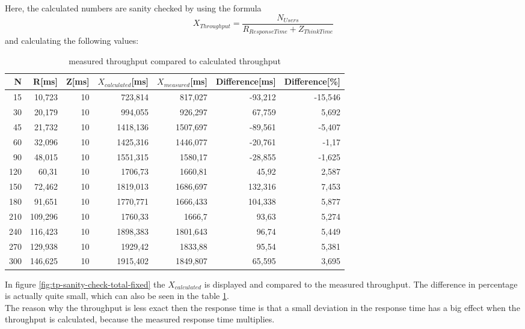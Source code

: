 \documentclass[a4paper]{article}
\begin{document}
{Here, the calculated numbers are sanity checked by using the formula $$X_{Throughput}=\frac{N_{Users}}{R_{ResponseTime} + Z_{ThinkTime}}$$ and calculating the following values:

\begin{table}[h!]
\begin{center}
\begin{tabular}{|r|r|r|r|r|r|r|}
\hline
\textbf{N} & \textbf{R[ms]} & \textbf{Z[ms]} & \textbf{$X_{calculated}$[ms]} & \textbf{$X_{measured}$[ms]} & \textbf{Difference[ms]} & \textbf{Difference[\%]} \\ \hline
15  & 10,723 & 10 & 723,814  & 817,027 & -93,212 & -15,546 \\ \hline
30  & 20,179 & 10 & 994,055  & 926,297 & 67,759  & 5,692   \\ \hline
45  & 21,732 & 10 & 1418,136  & 1507,697 & -89,561 & -5,407 \\ \hline
60  & 32,096 & 10 & 1425,316  & 1446,077 & -20,761 & -1,17 \\ \hline
90  & 48,015 & 10 & 1551,315  & 1580,17     & -28,855 & -1,625 \\ \hline
120 & 60,31 & 10 & 1706,73  & 1660,81     & 45,92  & 2,587  \\ \hline
150 & 72,462 & 10 & 1819,013  & 1686,697 & 132,316  & 7,453  \\ \hline
180 & 91,651 & 10 & 1770,771  & 1666,433 & 104,338  & 5,877   \\ \hline
210 & 109,296 & 10 & 1760,33   & 1666,7      & 93,63  & 5,274  \\ \hline
240 & 116,423 & 10 & 1898,383  & 1801,643 & 96,74  & 5,449  \\ \hline
270 & 129,938  & 10 & 1929,42   & 1833,88     & 95,54  & 5,381  \\ \hline
300 & 146,625 & 10 & 1915,402  & 1849,807 & 65,595  & 3,695  \\ \hline
\end{tabular}
\caption{measured throughput compared to calculated throughput}
\label{tab:sanity-check}
\end{center}
\end{table}

In figure \ref{fig:tp-sanity-check-total-fixed} the $X_{calculated}$ is displayed and compared to the measured throughput. The difference in percentage is actually quite small, which can also be seen in the table \ref{tab:sanity-check}.\\

The reason why the throughput is less exact then the response time is that a small deviation in the response time has a big effect when the throughput is calculated, because the measured response time multiplies.\\

}
\end{document}
